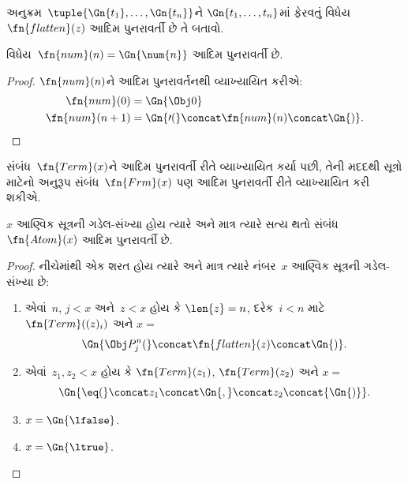 \begin{prob}
અનુક્રમ~$\tuple{\Gn{t_1}, \dots, \Gn{t_n}}$ને
$\Gn{t_1, \dots, t_n}$માં ફેરવતું
વિધેય~$\fn{flatten}(z)$ આદિમ
પુનરાવર્તી છે તે બતાવો.
\end{prob}

\begin{prop}
  વિધેય~$\fn{num}(n) = \Gn{\num{n}}$ આદિમ પુનરાવર્તી છે.
\end{prop}

\begin{proof}
  $\fn{num}(n)$ને આદિમ પુનરાવર્તનથી વ્યાખ્યાયિત કરીએ:
  \begin{align*}
    \fn{num}(0) & = \Gn{\Obj 0}\\
    \fn{num}(n+1) & = \Gn{\prime(} \concat \fn{num}(n) \concat \Gn{)}.
  \end{align*}
\end{proof}
\endgroup


\begingroup
\makeatletter{}\makeatother

\label{guunit:OLP-0284}


સંબંધ~$\fn{Term}(x)$ને આદિમ
પુનરાવર્તી રીતે વ્યાખ્યાયિત કર્યા પછી,
તેની મદદથી સૂત્રો માટેનો અનુરૂપ
સંબંધ~$\fn{Frm}(x)$ પણ આદિમ
પુનરાવર્તી રીતે વ્યાખ્યાયિત કરી શકીએ.

\begin{prop}
$x$ આણ્વિક સૂત્રની ગડેલ-સંખ્યા
હોય ત્યારે અને માત્ર ત્યારે સત્ય થતો
સંબંધ~$\fn{Atom}(x)$ આદિમ પુનરાવર્તી છે.
\end{prop}

\begin{proof}
નીચેમાંથી એક શરત હોય ત્યારે અને માત્ર
ત્યારે નંબર~$x$ આણ્વિક સૂત્રની
ગડેલ-સંખ્યા છે:
\begin{enumerate}
\item એવાં~$n$, $j < x$ અને~$z < x$
  હોય કે $\len{z}=n$, દરેક~$i < n$ માટે
  $\fn{Term}((z)_i)$ અને $x = $
\[
\Gn{\Obj P^n_j(} \concat \fn{flatten}(z) \concat \Gn{)}.
\]
\item એવાં~$z_1, z_2 < x$ હોય કે
  $\fn{Term}(z_1)$, $\fn{Term}(z_2)$
  અને $x = $
\[
\Gn{{\eq}(} \concat z_1 \concat \Gn{,} \concat z_2 \concat{\Gn{)}}.
\]
  \item $x = \Gn{\lfalse}$.
  \item $x = \Gn{\ltrue}$.
\end{enumerate}
\end{proof}

